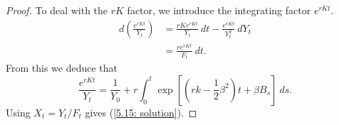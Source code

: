 \documentclass[11pt,letterpaper]{report}
\begin{document}
\begin{proof}
	\noindent To deal with the $rK$ factor, we introduce the integrating factor $e^{rKt}$.
	\begin{align*}
		d\left( \frac{e^{rKt}}{Y_t}\right) &= \frac{rKe^{rKt}}{Y_t}\ dt - \frac{e^{rKt}}{Y_t^2}\ dY_t\\
		&= \frac{re^{rKt}}{F_t}\ dt.
	\end{align*}
	From this we deduce that
	\[
	\frac{e^{rKt}}{Y_t} = \frac{1}{Y_0}+ r\int_0^t \exp\left[\left(rk-\frac{1}{2}\beta^2 \right)t + \beta B_s \right]\ ds.
	\]
	Using $X_t = Y_t/F_t$ gives (\ref{5.15: solution}).
\end{proof}
\end{document}
